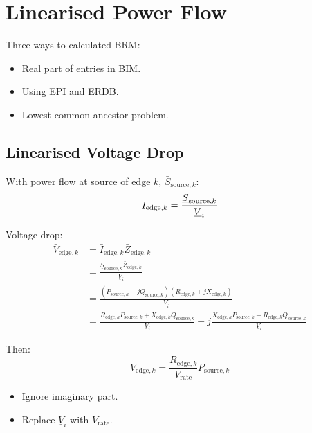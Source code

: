 \documentclass[
]{book}
\providecommand{\tightlist}{%
  \setlength{\itemsep}{0pt}\setlength{\parskip}{0pt}}
\begin{document}
\hypertarget{linearised-power-flow}{%
\chapter{Linearised Power Flow}\label{linearised-power-flow}}

Three ways to calculated BRM:

\begin{itemize}
\tightlist
\item
  Real part of entries in BIM.
\item
  \protect\hyperlink{linearVoltageDrop}{Using EPI and ERDB}.
\item
  Lowest common ancestor problem.
\end{itemize}

\hypertarget{linearVoltageDrop}{%
\section{Linearised Voltage Drop}\label{linearVoltageDrop}}

With power flow at source of edge \(k\), \(\bar{S}_{\text{source}, k}\):
\[
\bar{I}_{\text{edge}, k}
  = \frac{\underline{S}_{\text{source}, k}}{\underline{V}_i} \\
\]

Voltage drop:
\[
\begin{aligned}
  \bar{V}_{\text{edge}, k}
  &= \bar{I}_{\text{edge}, k} \bar{Z}_{\text{edge}, k} \\
  &= \frac{
    \underline{S}_{\text{source}, k} \bar{Z}_{\text{edge}, k}
  }{\underline{V}_i} \\
  &= \frac{
    \left(P_{\text{source}, k} - j Q_{\text{source}, k} \right)
    \left(R_{\text{edge}, k} + j X_{\text{edge}, k} \right)
  }{\underline{V}_i} \\
  &= \frac{
    R_{\text{edge}, k} P_{\text{source}, k}
    + X_{\text{edge}, k} Q_{\text{source}, k}
  }{\underline{V}_i}
  + j \frac{
    X_{\text{edge}, k} P_{\text{source}, k}
    - R_{\text{edge}, k} Q_{\text{source}, k}
  }{\underline{V}_i}
\end{aligned}
\]

Then:
\[
V_{\text{edge}, k} =
  \frac{R_{\text{edge}, k}}{V_\text{rate}} P_{\text{source}, k}
\]

\begin{itemize}
\tightlist
\item
  Ignore imaginary part.
\item
  Replace \(\underline{V}_i\) with \(V_\text{rate}\).
\end{itemize}
\end{document}
